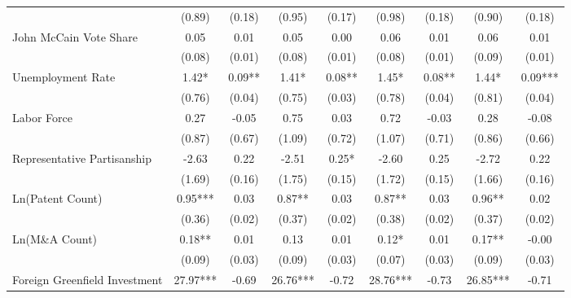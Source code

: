 \begin{table}[!htbp]
\begin{tabular}{l*{8}{c}}
                    &      (0.89)   &      (0.18)   &      (0.95)   &      (0.17)   &      (0.98)   &      (0.18)   &      (0.90)   &      (0.18)   \\
John McCain Vote Share&        0.05   &        0.01   &        0.05   &        0.00   &        0.06   &        0.01   &        0.06   &        0.01   \\
                    &      (0.08)   &      (0.01)   &      (0.08)   &      (0.01)   &      (0.08)   &      (0.01)   &      (0.09)   &      (0.01)   \\
Unemployment Rate   &        1.42*  &        0.09** &        1.41*  &        0.08** &        1.45*  &        0.08** &        1.44*  &        0.09***\\
                    &      (0.76)   &      (0.04)   &      (0.75)   &      (0.03)   &      (0.78)   &      (0.04)   &      (0.81)   &      (0.04)   \\
Labor Force         &        0.27   &       -0.05   &        0.75   &        0.03   &        0.72   &       -0.03   &        0.28   &       -0.08   \\
                    &      (0.87)   &      (0.67)   &      (1.09)   &      (0.72)   &      (1.07)   &      (0.71)   &      (0.86)   &      (0.66)   \\
Representative Partisanship&       -2.63   &        0.22   &       -2.51   &        0.25*  &       -2.60   &        0.25   &       -2.72   &        0.22   \\
                    &      (1.69)   &      (0.16)   &      (1.75)   &      (0.15)   &      (1.72)   &      (0.15)   &      (1.66)   &      (0.16)   \\
Ln(Patent Count)    &        0.95***&        0.03   &        0.87** &        0.03   &        0.87** &        0.03   &        0.96** &        0.02   \\
                    &      (0.36)   &      (0.02)   &      (0.37)   &      (0.02)   &      (0.38)   &      (0.02)   &      (0.37)   &      (0.02)   \\
Ln(M\&A Count)      &        0.18** &        0.01   &        0.13   &        0.01   &        0.12*  &        0.01   &        0.17** &       -0.00   \\
                    &      (0.09)   &      (0.03)   &      (0.09)   &      (0.03)   &      (0.07)   &      (0.03)   &      (0.09)   &      (0.03)   \\
Foreign Greenfield Investment&       27.97***&       -0.69   &       26.76***&       -0.72   &       28.76***&       -0.73   &       26.85***&       -0.71   \\

\end{tabular}
\end{table}
